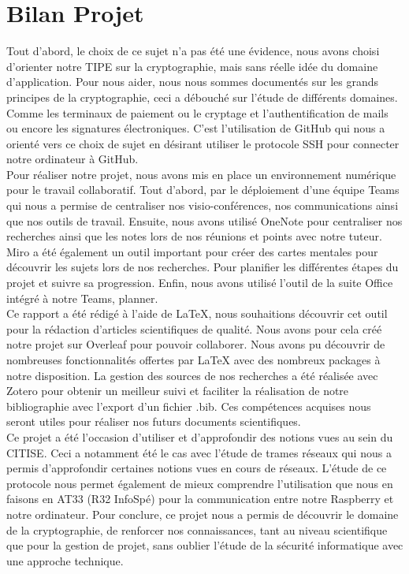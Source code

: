\chapter{Bilan Projet}

Tout d'abord, le choix de ce sujet n'a pas été une évidence, nous avons choisi d'orienter notre TIPE sur la cryptographie, mais sans réelle idée du domaine d'application. Pour nous aider, nous nous sommes documentés sur les grands principes de la cryptographie, ceci a débouché sur l'étude de différents domaines. Comme les terminaux de paiement ou le cryptage et l'authentification de mails ou encore les signatures électroniques. C'est l'utilisation de GitHub qui nous a orienté vers ce choix de sujet en désirant utiliser le protocole SSH pour connecter notre ordinateur à GitHub.\\

Pour réaliser notre projet, nous avons mis en place un environnement numérique pour le travail collaboratif. Tout d'abord, par le déploiement d'une équipe Teams qui nous a permise de centraliser nos visio-conférences, nos communications ainsi que nos outils de travail. Ensuite, nous avons utilisé OneNote pour centraliser nos recherches ainsi que les notes lors de nos réunions et points avec notre tuteur. Miro a été également un outil important pour créer des cartes mentales pour découvrir les sujets lors de nos recherches. Pour planifier les différentes étapes du projet et suivre sa progression. Enfin, nous avons utilisé l'outil de la suite Office intégré à notre Teams, planner.\\

Ce rapport a été rédigé à l'aide de \LaTeX{}, nous souhaitions découvrir cet outil pour la rédaction d'articles scientifiques de qualité. Nous avons pour cela créé notre projet sur Overleaf pour pouvoir collaborer. Nous avons pu découvrir de nombreuses fonctionnalités offertes par \LaTeX{} avec des nombreux packages à notre disposition. La gestion des sources de nos recherches a été réalisée avec Zotero pour obtenir un meilleur suivi et faciliter la réalisation de notre bibliographie avec l'export d'un fichier {\ttfamily .bib}. Ces compétences acquises nous seront utiles pour réaliser nos futurs documents scientifiques.\\

Ce projet a été l'occasion d'utiliser et d'approfondir des notions vues au sein du CITISE. Ceci a notamment été le cas avec l'étude de trames réseaux qui nous a permis d'approfondir certaines notions vues en cours de réseaux. L'étude de ce protocole nous permet également de mieux comprendre l'utilisation que nous en faisons en AT33 (R32 InfoSpé) pour la communication entre notre Raspberry et notre ordinateur. Pour conclure, ce projet nous a permis de découvrir le domaine de la cryptographie, de renforcer nos connaissances, tant au niveau scientifique que pour la gestion de projet, sans oublier l'étude de la sécurité informatique avec une approche technique.
